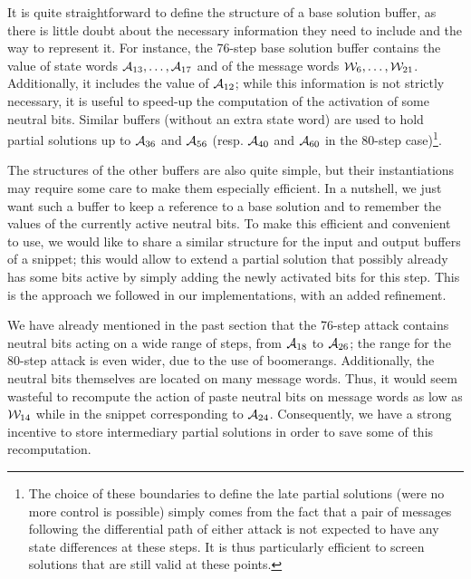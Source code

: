 It is quite straightforward to define the structure of a base solution buffer, as there is little doubt about the necessary information they need
to include and the way to represent it. For instance, the 76-step base solution buffer contains the value of state words $\mathcal{A}_{13},\ldots,\mathcal{A}_{17}$
and of the message words $\mathcal{W}_6,\ldots,\mathcal{W}_{21}$. Additionally, it includes the value of $\mathcal{A}_{12}$; while this information is
not strictly necessary, it is useful to speed-up the computation of the activation of some neutral bits. Similar buffers (without an extra state word)
are used to hold partial solutions up to $\mathcal{A}_{36}$ and $\mathcal{A}_{56}$ (resp. $\mathcal{A}_{40}$ and $\mathcal{A}_{60}$ in the 80-step case)\footnote{The choice
of these boundaries to define the late partial solutions (were no more control is possible) simply comes from the fact that a pair of messages following
the differential path of either attack is not expected to have any state differences at these steps. It is thus particularly efficient to screen
solutions that are still valid at these points.}.

The structures of the other buffers are also quite simple, but their instantiations may require some care to make them especially efficient.
In a nutshell, we just want such a buffer to keep a reference to a base solution and to remember the values of the currently active neutral bits.
To make this efficient and convenient to use, we would like to share a similar structure for the input and output buffers of a snippet; this would
allow to extend a partial solution that possibly already has some bits active by simply adding the newly activated bits for this step. This is the
approach we followed in our implementations, with an added refinement.

\medskip

We have already mentioned in the past section that \eg the 76-step attack contains neutral bits acting on a wide range of steps, from $\mathcal{A}_{18}$
to $\mathcal{A}_{26}$; the range for the 80-step attack is even wider, due to the use of boomerangs. Additionally, the neutral bits themselves are located on many message
words. Thus, it would seem wasteful to recompute the action of paste neutral bits on message words as low as $\mathcal{W}_{14}$ while in the snippet corresponding
\eg to $\mathcal{A}_{24}$. Consequently, we have a strong incentive to store intermediary partial solutions in order to save some of this recomputation.

